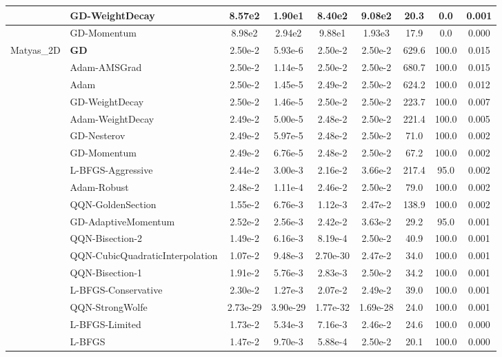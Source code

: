 \documentclass{article}
\begin{document}
\begin{longtable}{|l|l|c|c|c|c|c|c|c|}
\hline
 & GD-WeightDecay & 8.57e2 & 1.90e1 & 8.40e2 & 9.08e2 & 20.3 & 0.0 & 0.001 \\
\hline
 & GD-Momentum & 8.98e2 & 2.94e2 & 9.88e1 & 1.93e3 & 17.9 & 0.0 & 0.000 \\
Matyas\_2D & \textbf{GD} & 2.50e-2 & 5.93e-6 & 2.50e-2 & 2.50e-2 & 629.6 & 100.0 & 0.015 \\
\hline
 & Adam-AMSGrad & 2.50e-2 & 1.14e-5 & 2.50e-2 & 2.50e-2 & 680.7 & 100.0 & 0.015 \\
\hline
 & Adam & 2.50e-2 & 1.45e-5 & 2.49e-2 & 2.50e-2 & 624.2 & 100.0 & 0.012 \\
\hline
 & GD-WeightDecay & 2.50e-2 & 1.46e-5 & 2.50e-2 & 2.50e-2 & 223.7 & 100.0 & 0.007 \\
\hline
 & Adam-WeightDecay & 2.49e-2 & 5.00e-5 & 2.48e-2 & 2.50e-2 & 221.4 & 100.0 & 0.005 \\
\hline
 & GD-Nesterov & 2.49e-2 & 5.97e-5 & 2.48e-2 & 2.50e-2 & 71.0 & 100.0 & 0.002 \\
\hline
 & GD-Momentum & 2.49e-2 & 6.76e-5 & 2.48e-2 & 2.50e-2 & 67.2 & 100.0 & 0.002 \\
\hline
 & L-BFGS-Aggressive & 2.44e-2 & 3.00e-3 & 2.16e-2 & 3.66e-2 & 217.4 & 95.0 & 0.002 \\
\hline
 & Adam-Robust & 2.48e-2 & 1.11e-4 & 2.46e-2 & 2.50e-2 & 79.0 & 100.0 & 0.002 \\
\hline
 & QQN-GoldenSection & 1.55e-2 & 6.76e-3 & 1.12e-3 & 2.47e-2 & 138.9 & 100.0 & 0.002 \\
\hline
 & GD-AdaptiveMomentum & 2.52e-2 & 2.56e-3 & 2.42e-2 & 3.63e-2 & 29.2 & 95.0 & 0.001 \\
\hline
 & QQN-Bisection-2 & 1.49e-2 & 6.16e-3 & 8.19e-4 & 2.50e-2 & 40.9 & 100.0 & 0.001 \\
\hline
 & QQN-CubicQuadraticInterpolation & 1.07e-2 & 9.48e-3 & 2.70e-30 & 2.47e-2 & 34.0 & 100.0 & 0.001 \\
\hline
 & QQN-Bisection-1 & 1.91e-2 & 5.76e-3 & 2.83e-3 & 2.50e-2 & 34.2 & 100.0 & 0.001 \\
\hline
 & L-BFGS-Conservative & 2.30e-2 & 1.27e-3 & 2.07e-2 & 2.49e-2 & 39.0 & 100.0 & 0.001 \\
\hline
 & QQN-StrongWolfe & 2.73e-29 & 3.90e-29 & 1.77e-32 & 1.69e-28 & 24.0 & 100.0 & 0.001 \\
\hline
 & L-BFGS-Limited & 1.73e-2 & 5.34e-3 & 7.16e-3 & 2.46e-2 & 24.6 & 100.0 & 0.000 \\
\hline
 & L-BFGS & 1.47e-2 & 9.70e-3 & 5.88e-4 & 2.50e-2 & 20.1 & 100.0 & 0.000 \\

\end{longtable}
\end{document}
